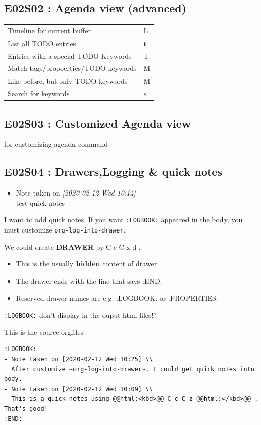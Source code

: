 \documentclass[11pt]{article}
\begin{document}
\subsection{E02S02 : Agenda view (advanced)}
\label{sec:orgb73dafe}
\begin{center}
\begin{tabular}{ll}
Timeline for current buffer &  L \\
List all TODO entries &  t \\
Entries with a special TODO Keywords &  T \\
Match tags/propoerties/TODO keywords &  M \\
Like before, but only TODO keywords &  M \\
Search for keywords &  s \\
\end{tabular}
\end{center}

\subsection{E02S03 : Customized Agenda view}
\label{sec:orga49f0e8}
for customizing agenda command 
\subsection{E02S04 : Drawers,Logging \& quick notes}
\label{sec:org5100ea0}
\begin{itemize}
\item Note taken on \textit{[2020-02-12 Wed 10:14] } \\
test quick notes
\end{itemize}
I want to add quick notes. If you want \texttt{:LOGBOOK:} appeared in the body, you
must customize \texttt{org-log-into-drawer}.

We could create \textbf{DRAWER} by  C-c C-x d  .

\begin{itemize}
\item This is the usually \textbf{hidden} content of drawer
\item The drawer ends with the line that says :END:
\item Reserved drawer names are e.g. :LOGBOOK: or :PROPERTIES:
\end{itemize}
\texttt{:LOGBOOK:} don't display in the ouput html files!? 

This is the source orgfiles
\begin{verbatim}
:LOGBOOK:
- Note taken on [2020-02-12 Wed 10:25] \\
  After customize ~org-log-into-drawer~, I could get quick notes into body.
- Note taken on [2020-02-12 Wed 10:09] \\
  This is a quick notes using @@html:<kbd>@@ C-c C-z @@html:</kbd>@@ . That's good!
:END:
\end{verbatim}
\end{document}
